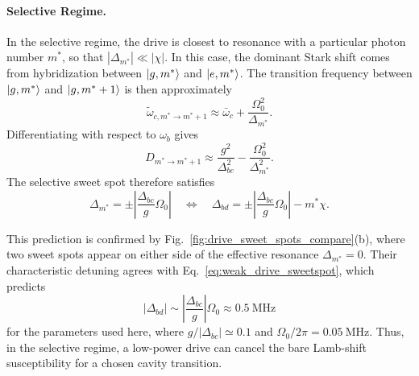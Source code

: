 \paragraph{Selective Regime.}
In the selective regime, the drive is closest to resonance with a particular photon number \(m^\ast\), so that \(|\Delta_{m^\ast}|\ll|\chi|\). In this case, the dominant Stark shift comes from hybridization between \(\ket{g,m^\ast}\) and \(\ket{e,m^\ast}\). The transition frequency between \(\ket{g,m^\ast}\) and \(\ket{g,m^\ast+1}\) is then approximately
\begin{equation}
\widetilde{\omega}_{c,m^\ast\rightarrow m^\ast+1}
\approx
\bar{\omega}_c+\frac{\Omega_0^2}{\Delta_{m^\ast}}.
\end{equation}
Differentiating with respect to \(\omega_b\) gives
\begin{equation}
\label{eq:Dm_selective}
D_{m^\ast\rightarrow m^\ast+1}
\approx
\frac{g^2}{\Delta_{bc}^2}
-\frac{\Omega_0^2}{\Delta_{m^\ast}^2}.
\end{equation}
The selective sweet spot therefore satisfies
\begin{equation}
\label{eq:weak_drive_sweetspot}
\Delta_{m^\ast}
=
\pm \left|\frac{\Delta_{bc}}{g}\Omega_0\right|
\quad\Longleftrightarrow\quad
\Delta_{bd}
=
\pm \left|\frac{\Delta_{bc}}{g}\Omega_0\right|-m^\ast\chi .
\end{equation}

This prediction is confirmed by Fig.~\ref{fig:drive_sweet_spots_compare}(b), where two sweet spots appear on either side of the effective resonance \(\Delta_{m^\ast}=0\). Their characteristic detuning agrees with Eq.~\eqref{eq:weak_drive_sweetspot}, which predicts
\[
|\Delta_{bd}|
\sim
\left|\frac{\Delta_{bc}}{g}\right|\Omega_0
\approx 0.5~\mathrm{MHz}
\]
for the parameters used here, where \(g/|\Delta_{bc}|\simeq 0.1\) and \(\Omega_0/2\pi=0.05~\mathrm{MHz}\). Thus, in the selective regime, a low-power drive can cancel the bare Lamb-shift susceptibility for a chosen cavity transition.

